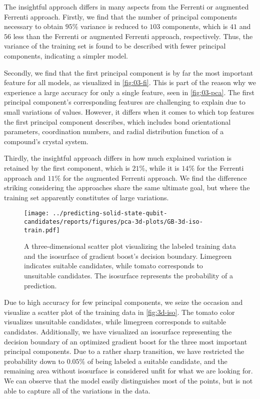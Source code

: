 The insightful approach differs in many aspects from the Ferrenti or augmented Ferrenti approach. Firstly, we find that the number of principal components necessary to obtain $95\%$ variance is reduced to $103$ components, which is $41$ and $56$ less than the Ferrenti or augmented Ferrenti approach, respectively. Thus, the variance of the training set is found to be described with fewer principal components, indicating a simpler model.

Secondly, we find that the first principal component is by far the most important feature for all models, as visualized in \autoref{fig:03-fi}. This is part of the reason why we experience a large accuracy for only a single feature, seen in \autoref{fig:03-pca}. The first principal component's corresponding features are challenging to explain due to small variations of values. However, it differs when it comes to which top features the first principal component describes, which includes bond orientational parameters, coordination numbers, and radial distribution function of a compound's crystal system.

Thirdly, the insightful approach differs in how much explained variation is retained by the first component, which is $21\%$, while it is $14\%$ for the Ferrenti approach and $11\%$ for the augmented Ferrenti approach. We find the difference striking considering the approaches share the same ultimate goal, but where the training set apparently constitutes of large variations.

\begin{figure}[h!]
    \centering
    \texttt{[image: ../predicting-solid-state-qubit-candidates/reports/figures/pca-3d-plots/GB-3d-iso-train.pdf]}
  \vspace*{-140mm}
  \caption{A three-dimensional scatter plot visualizing the labeled training data and the isosurface of gradient boost's decision boundary. Limegreen indicates suitable candidates, while tomato corresponds to unsuitable candidates. The isosurface represents the probability of a prediction.}
  \label{fig:3d-iso}
\end{figure}

Due to high accuracy for few principal components, we seize the occasion and visualize a scatter plot of the training data in \autoref{fig:3d-iso}. The tomato color visualizes unsuitable candidates, while limegreen corresponds to suitable candidates. Additionally, we have visualized an isosurface representing the decision boundary of an optimized gradient boost for the three most important principal components. Due to a rather sharp transition, we have restricted the probability down to $0.05\%$ of being labeled a suitable candidate, and the remaining area without isosurface is considered unfit for what we are looking for. We can observe that the model easily distinguishes most of the points, but is not able to capture all of the variations in the data.

